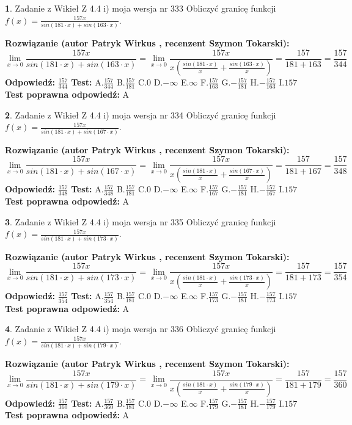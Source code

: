 \documentclass[12pt, a4paper]{article}
\theoremstyle{definition} %
\newtheorem{zad}{}
\newcommand{\zadStart}[1]{\begin{zad}#1\newline}
\newcommand{\zadStop}{\end{zad}}
\newcommand{\rozwStart}[2]{\noindent \textbf{Rozwiązanie (autor #1 , recenzent #2): }\newline}
\newcommand{\rozwStop}{\newline}
\newcommand{\odpStart}{\noindent \textbf{Odpowiedź:}\newline}
\newcommand{\odpStop}{\newline}
\newcommand{\testStart}{\noindent \textbf{Test:}\newline}
\newcommand{\testStop}{\newline}
\newcommand{\kluczStart}{\noindent \textbf{Test poprawna odpowiedź:}\newline}
\newcommand{\kluczStop}{\newline}
\begin{document}
\zadStart{Zadanie z Wikieł Z 4.4 i) moja wersja nr 333}
Obliczyć granicę funkcji $f(x)=\frac{157x}{sin(181\cdot x) +sin(163\cdot x)}$.
\zadStop
\rozwStart{Patryk Wirkus}{Szymon Tokarski}
$$\lim\limits_{x\to 0}\frac{157x}{sin(181\cdot x) +sin(163\cdot x)}=\lim\limits_{x\to 0}\frac{157x}{x(\frac{sin(181\cdot x)}{x}+\frac{sin(163\cdot x)}{x})}=\frac{157}{181+163} = \frac{157}{344}$$
\rozwStop
\odpStart
$\frac{157}{344}$
\odpStop
\testStart
A.$\frac{157}{344}$
B.$\frac{157}{181}$
C.$0$
D.$-\infty$
E.$\infty$
F.$\frac{157}{163}$
G.$-\frac{157}{181}$
H.$-\frac{157}{163}$
I.$157$
\testStop
\kluczStart
A
\kluczStop



\zadStart{Zadanie z Wikieł Z 4.4 i) moja wersja nr 334}
Obliczyć granicę funkcji $f(x)=\frac{157x}{sin(181\cdot x) +sin(167\cdot x)}$.
\zadStop
\rozwStart{Patryk Wirkus}{Szymon Tokarski}
$$\lim\limits_{x\to 0}\frac{157x}{sin(181\cdot x) +sin(167\cdot x)}=\lim\limits_{x\to 0}\frac{157x}{x(\frac{sin(181\cdot x)}{x}+\frac{sin(167\cdot x)}{x})}=\frac{157}{181+167} = \frac{157}{348}$$
\rozwStop
\odpStart
$\frac{157}{348}$
\odpStop
\testStart
A.$\frac{157}{348}$
B.$\frac{157}{181}$
C.$0$
D.$-\infty$
E.$\infty$
F.$\frac{157}{167}$
G.$-\frac{157}{181}$
H.$-\frac{157}{167}$
I.$157$
\testStop
\kluczStart
A
\kluczStop



\zadStart{Zadanie z Wikieł Z 4.4 i) moja wersja nr 335}
Obliczyć granicę funkcji $f(x)=\frac{157x}{sin(181\cdot x) +sin(173\cdot x)}$.
\zadStop
\rozwStart{Patryk Wirkus}{Szymon Tokarski}
$$\lim\limits_{x\to 0}\frac{157x}{sin(181\cdot x) +sin(173\cdot x)}=\lim\limits_{x\to 0}\frac{157x}{x(\frac{sin(181\cdot x)}{x}+\frac{sin(173\cdot x)}{x})}=\frac{157}{181+173} = \frac{157}{354}$$
\rozwStop
\odpStart
$\frac{157}{354}$
\odpStop
\testStart
A.$\frac{157}{354}$
B.$\frac{157}{181}$
C.$0$
D.$-\infty$
E.$\infty$
F.$\frac{157}{173}$
G.$-\frac{157}{181}$
H.$-\frac{157}{173}$
I.$157$
\testStop
\kluczStart
A
\kluczStop



\zadStart{Zadanie z Wikieł Z 4.4 i) moja wersja nr 336}
Obliczyć granicę funkcji $f(x)=\frac{157x}{sin(181\cdot x) +sin(179\cdot x)}$.
\zadStop
\rozwStart{Patryk Wirkus}{Szymon Tokarski}
$$\lim\limits_{x\to 0}\frac{157x}{sin(181\cdot x) +sin(179\cdot x)}=\lim\limits_{x\to 0}\frac{157x}{x(\frac{sin(181\cdot x)}{x}+\frac{sin(179\cdot x)}{x})}=\frac{157}{181+179} = \frac{157}{360}$$
\rozwStop
\odpStart
$\frac{157}{360}$
\odpStop
\testStart
A.$\frac{157}{360}$
B.$\frac{157}{181}$
C.$0$
D.$-\infty$
E.$\infty$
F.$\frac{157}{179}$
G.$-\frac{157}{181}$
H.$-\frac{157}{179}$
I.$157$
\testStop
\kluczStart
A
\kluczStop
\end{document}
